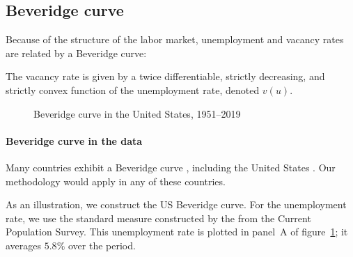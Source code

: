 \documentclass[letterpaper,12pt,leqno]{article}
\def\pdf{../../figures/xhosios_202103.pdf}
\begin{document}
\subsection{Beveridge curve}

Because of the structure of the labor market, unemployment and vacancy rates are related by a Beveridge curve:

\begin{assumption}\label{a:v} The vacancy rate is given by a twice differentiable, strictly decreasing, and strictly convex function of the unemployment rate, denoted $v(u)$. \end{assumption}

\begin{figure}[p]
\hfill
{}\vfig
{}\hfill
{}\vfig
{}\hfill
{}
\caption{Beveridge curve in the United States, 1951--2019}
\label{f:beveridge}\end{figure}

\paragraph{Beveridge curve in the data} Many countries exhibit a Beveridge curve , including the United States . Our methodology would apply in any of these countries. 

As an illustration, we construct the US Beveridge curve. For the unemployment rate, we use the standard measure constructed by the  from the Current Population Survey. This unemployment rate is plotted in panel~A of figure~\ref{f:beveridge}; it averages $5.8\%$ over the period.
\end{document}
